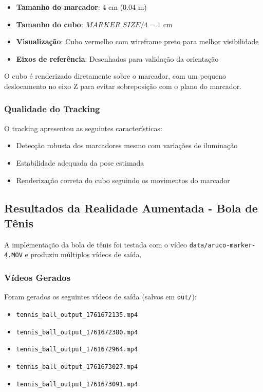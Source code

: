 \begin{itemize}
    \item \textbf{Tamanho do marcador}: 4 cm (0.04 m)
    \item \textbf{Tamanho do cubo}: $MARKER\_SIZE/4 = 1$ cm
    \item \textbf{Visualização}: Cubo vermelho com wireframe preto para melhor visibilidade
    \item \textbf{Eixos de referência}: Desenhados para validação da orientação
\end{itemize}

O cubo é renderizado diretamente sobre o marcador, com um pequeno deslocamento no eixo Z para evitar sobreposição com o plano do marcador.

\subsubsection{Qualidade do Tracking}

O tracking apresentou as seguintes características:
\begin{itemize}
    \item Detecção robusta dos marcadores mesmo com variações de iluminação
    \item Estabilidade adequada da pose estimada
    \item Renderização correta do cubo seguindo os movimentos do marcador
\end{itemize}

\subsection{Resultados da Realidade Aumentada - Bola de Tênis}

A implementação da bola de tênis foi testada com o vídeo \texttt{data/aruco-marker-4.MOV} e produziu múltiplos vídeos de saída.

\subsubsection{Vídeos Gerados}

Foram gerados os seguintes vídeos de saída (salvos em \texttt{out/}):
\begin{itemize}
    \item \texttt{tennis\_ball\_output\_1761672135.mp4}
    \item \texttt{tennis\_ball\_output\_1761672380.mp4}
    \item \texttt{tennis\_ball\_output\_1761672964.mp4}
    \item \texttt{tennis\_ball\_output\_1761673027.mp4}
    \item \texttt{tennis\_ball\_output\_1761673091.mp4}
\end{itemize}

